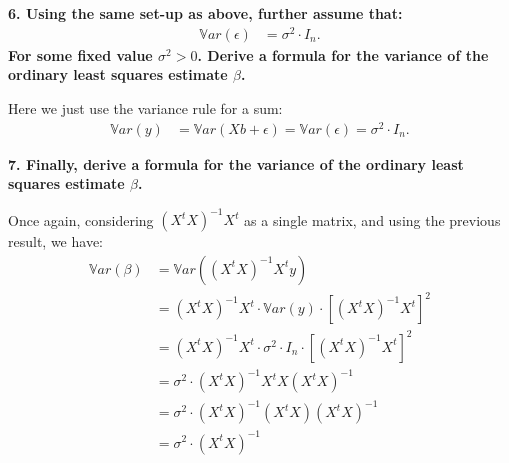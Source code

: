 \documentclass[12pt,hidelinks]{article}
\numberwithin{equation}{section}
\begin{document}
\vspace*{12pt}

\textbf{6. Using the same set-up as above, further assume that:}
\begin{align}
\mathbb{V}ar(\epsilon) &= \sigma^2 \cdot I_n.
\end{align}
\textbf{For some fixed value $\sigma^2 > 0$. Derive a formula for the variance
of the ordinary least squares estimate $\beta$.}

\vspace*{12pt}

Here we just use the variance rule for a sum:
\begin{align}
\mathbb{V}ar(y) &= \mathbb{V}ar(Xb + \epsilon) = \mathbb{V}ar(\epsilon) = \sigma^2 \cdot I_n.
\end{align}

\vspace*{12pt}

\textbf{7. Finally, derive a formula for the variance of the ordinary least
squares estimate $\beta$.}

\vspace*{12pt}

Once again, considering $(X^tX)^{-1} X^t$ as a single matrix, and using the
previous result, we have:
\begin{align}
\mathbb{V}ar(\beta) &= \mathbb{V}ar((X^t X)^{-1} X^t y) \\
&= (X^t X)^{-1} X^t \cdot \mathbb{V}ar(y) \cdot \left[(X^t X)^{-1} X^t \right]^2 \\
&= (X^t X)^{-1} X^t \cdot \sigma^2 \cdot I_n \cdot \left[(X^t X)^{-1} X^t \right]^2 \\
&= \sigma^2 \cdot (X^t X)^{-1} X^t X (X^t X)^{-1} \\
&= \sigma^2 \cdot (X^t X)^{-1} (X^t X) (X^t X)^{-1} \\
&= \sigma^2 \cdot (X^t X)^{-1}
\end{align}
\end{document}
